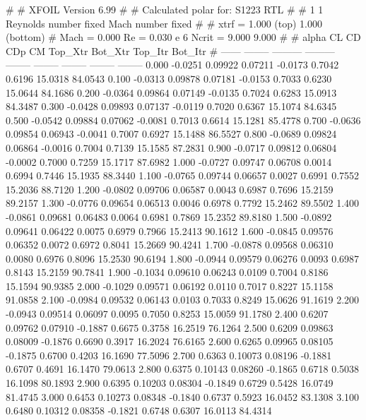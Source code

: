 #  
#       XFOIL         Version 6.99
#  
# Calculated polar for: S1223 RTL                                       
#  
# 1 1 Reynolds number fixed          Mach number fixed         
#  
# xtrf =   1.000 (top)        1.000 (bottom)  
# Mach =   0.000     Re =     0.030 e 6     Ncrit =   9.000  9.000
#  
#   alpha    CL        CD       CDp       CM     Top_Xtr  Bot_Xtr  Top_Itr  Bot_Itr
#  ------ -------- --------- --------- -------- -------- -------- -------- --------
   0.000  -0.0251   0.09922   0.07211  -0.0173   0.7042   0.6196  15.0318  84.0543
   0.100  -0.0313   0.09878   0.07181  -0.0153   0.7033   0.6230  15.0644  84.1686
   0.200  -0.0364   0.09864   0.07149  -0.0135   0.7024   0.6283  15.0913  84.3487
   0.300  -0.0428   0.09893   0.07137  -0.0119   0.7020   0.6367  15.1074  84.6345
   0.500  -0.0542   0.09884   0.07062  -0.0081   0.7013   0.6614  15.1281  85.4778
   0.700  -0.0636   0.09854   0.06943  -0.0041   0.7007   0.6927  15.1488  86.5527
   0.800  -0.0689   0.09824   0.06864  -0.0016   0.7004   0.7139  15.1585  87.2831
   0.900  -0.0717   0.09812   0.06804  -0.0002   0.7000   0.7259  15.1717  87.6982
   1.000  -0.0727   0.09747   0.06708   0.0014   0.6994   0.7446  15.1935  88.3440
   1.100  -0.0765   0.09744   0.06657   0.0027   0.6991   0.7552  15.2036  88.7120
   1.200  -0.0802   0.09706   0.06587   0.0043   0.6987   0.7696  15.2159  89.2157
   1.300  -0.0776   0.09654   0.06513   0.0046   0.6978   0.7792  15.2462  89.5502
   1.400  -0.0861   0.09681   0.06483   0.0064   0.6981   0.7869  15.2352  89.8180
   1.500  -0.0892   0.09641   0.06422   0.0075   0.6979   0.7966  15.2413  90.1612
   1.600  -0.0845   0.09576   0.06352   0.0072   0.6972   0.8041  15.2669  90.4241
   1.700  -0.0878   0.09568   0.06310   0.0080   0.6976   0.8096  15.2530  90.6194
   1.800  -0.0944   0.09579   0.06276   0.0093   0.6987   0.8143  15.2159  90.7841
   1.900  -0.1034   0.09610   0.06243   0.0109   0.7004   0.8186  15.1594  90.9385
   2.000  -0.1029   0.09571   0.06192   0.0110   0.7017   0.8227  15.1158  91.0858
   2.100  -0.0984   0.09532   0.06143   0.0103   0.7033   0.8249  15.0626  91.1619
   2.200  -0.0943   0.09514   0.06097   0.0095   0.7050   0.8253  15.0059  91.1780
   2.400   0.6207   0.09762   0.07910  -0.1887   0.6675   0.3758  16.2519  76.1264
   2.500   0.6209   0.09863   0.08009  -0.1876   0.6690   0.3917  16.2024  76.6165
   2.600   0.6265   0.09965   0.08105  -0.1875   0.6700   0.4203  16.1690  77.5096
   2.700   0.6363   0.10073   0.08196  -0.1881   0.6707   0.4691  16.1470  79.0613
   2.800   0.6375   0.10143   0.08260  -0.1865   0.6718   0.5038  16.1098  80.1893
   2.900   0.6395   0.10203   0.08304  -0.1849   0.6729   0.5428  16.0749  81.4745
   3.000   0.6453   0.10273   0.08348  -0.1840   0.6737   0.5923  16.0452  83.1308
   3.100   0.6480   0.10312   0.08358  -0.1821   0.6748   0.6307  16.0113  84.4314
